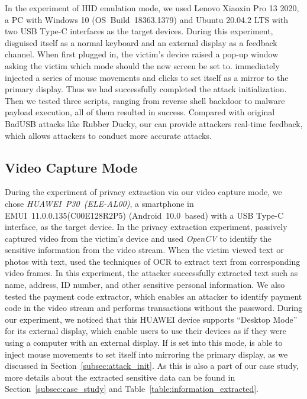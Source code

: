 In the experiment of HID emulation mode, we used {Lenovo Xiaoxin Pro 13
2020}, a PC with Windows 10 \mbox{(OS Build 18363.1379)} and Ubuntu 20.04.2 LTS with two \ac{USB} Type-C interfaces as the
target devices. During this experiment, \tool disguised itself as a normal keyboard and an external display as a feedback channel. When first plugged in, the victim's device raised a pop-up window asking the victim which mode should the new screen be set to. \tool immediately injected a series of mouse movements and clicks to set itself as a mirror to the primary display. Thus we had successfully completed the attack initialization. Then we tested three scripts, ranging from reverse shell backdoor to malware payload execution, all of them resulted in success.
Compared with original BadUSB attacks like Rubber Ducky, our \tool can provide attackers real-time feedback, which allows attackers to conduct more accurate attacks.


\subsection{Video Capture Mode}

During the experiment of privacy extraction via our video capture mode, we chose \mbox{\textit{HUAWEI P30 (ELE-AL00)}}, a
smartphone in \mbox{EMUI 11.0.0.135(C00E128R2P5)} \mbox{(Android 10.0 based)} with a \ac{USB} Type-C interface, as the target device.
In the privacy extraction experiment, \tool passively captured video from the victim's device and used \textit{OpenCV} to identify the sensitive information from the video stream.  When the victim viewed text or photos with text, \tool used the techniques of \ac{OCR} to extract text from corresponding video frames.
In this experiment, the attacker successfully extracted text such as name, address, ID number, and other sensitive personal information. We also tested the payment code extractor, which enables an attacker to identify payment code in the video stream and performs transactions
without the password. During our experiment, we noticed that this HUAWEI device supports ``Desktop Mode'' for its external display, which enable users to use their devices as if they were using a computer with an external display.
If \tool is set into this mode, \tool is able to inject mouse movements to set itself into mirroring the primary display, as we discussed in Section~\ref{subsec:attack_init}.
As this is also a part of our case study, more details about
the extracted sensitive data can be found in Section~\ref{subsec:case_study} and
Table~\ref{table:information_extracted}.

